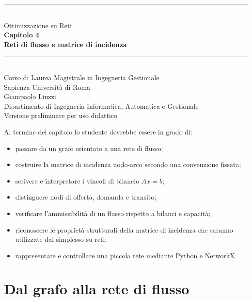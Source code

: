 \documentclass[11pt,a4paper]{article}
\begin{document}

\begin{titlepage}
  \centering
  \vspace*{1.6cm}
  {\color{sapienzared}\rule{\textwidth}{1.2pt}}\\[1.1cm]
  {\Large Ottimizzazione su Reti}\\[0.35cm]
  {\huge\bfseries Capitolo 4}\\[0.45cm]
  {\LARGE\bfseries Reti di flusso e matrice di incidenza}\\[1.1cm]
  {\color{sapienzared}\rule{0.72\textwidth}{0.8pt}}\\[1.1cm]
  {\large Corso di Laurea Magistrale in Ingegneria Gestionale}\\[0.25cm]
  {\large Sapienza Università di Roma}\\[1.2cm]
  {\large Giampaolo Liuzzi}\\[0.25cm]
  {\normalsize Dipartimento di Ingegneria Informatica, Automatica e Gestionale}\\[2cm]
  \vfill
  {\small Versione preliminare per uso didattico}
\end{titlepage}

\tableofcontents
\newpage
{}

\begin{learningbox}
Al termine del capitolo lo studente dovrebbe essere in grado di:
\begin{itemize}[nosep]
  \item passare da un grafo orientato a una rete di flusso;
  \item costruire la matrice di incidenza nodo-arco secondo una convenzione fissata;
  \item scrivere e interpretare i vincoli di bilancio $Ax=b$;
  \item distinguere nodi di offerta, domanda e transito;
  \item verificare l'ammissibilità di un flusso rispetto a bilanci e capacità;
  \item riconoscere le proprietà strutturali della matrice di incidenza che saranno utilizzate dal simplesso su reti;
  \item rappresentare e controllare una piccola rete mediante Python e NetworkX.
\end{itemize}
\end{learningbox}

\section{Dal grafo alla rete di flusso}
\end{document}

